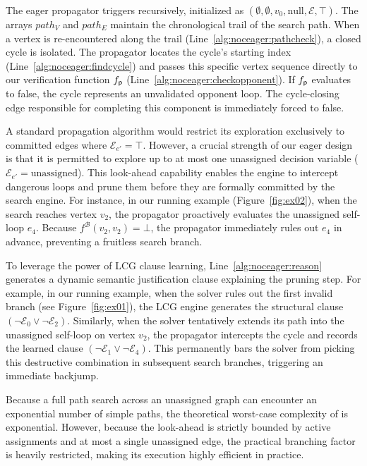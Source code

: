 \documentclass[a4paper,fleqn]{cas-sc}
\begin{document}
The eager propagator triggers recursively, initialized as \noceager$(\emptyset, \emptyset, v_0, \text{null}, \mathcal{E}, \top)$. The arrays $path_V$ and $path_E$ maintain the chronological trail of the search path. 
%
When a vertex is re-encountered along the trail (Line~\ref{alg:noceager:pathcheck}), a closed cycle is isolated. The propagator locates the cycle's starting index (Line~\ref{alg:noceager:findcycle}) and passes this specific vertex sequence directly to our verification function $f_{\mathsf{p}}$ (Line~\ref{alg:noceager:checkopponent}). If $f_{\mathsf{p}}$ evaluates to false, the cycle represents an unvalidated opponent loop. The cycle-closing edge responsible for completing this component is immediately forced to false.

A standard propagation algorithm would restrict its exploration exclusively to committed edges where $\mathcal{E}_{e'} = \top$. However, a crucial strength of our eager design is that it is permitted to explore up to at most one unassigned decision variable ($\mathcal{E}_{e'} = \text{unassigned}$). This look-ahead capability enables the engine to intercept dangerous loops and prune them before they are formally committed by the search engine. For instance, in our running example (Figure~\ref{fig:ex02}), when the search reaches vertex $v_2$, the propagator proactively evaluates the unassigned self-loop $e_4$. Because $f^{\mathcal{B}}(v_2, v_2) = \bot$, the propagator immediately rules out $e_4$ in advance, preventing a fruitless search branch.

To leverage the power of LCG clause learning, Line~\ref{alg:noceager:reason} generates a dynamic semantic justification clause explaining the pruning step. For example, in our running example, when the solver rules out the first invalid branch (see Figure~\ref{fig:ex01}), the LCG engine generates the structural clause $(\neg \mathcal{E}_0 \lor \neg \mathcal{E}_2)$. Similarly, when the solver tentatively extends its path into the unassigned self-loop on vertex $v_2$, the propagator intercepts the cycle and records the learned clause $(\neg \mathcal{E}_1 \lor \neg \mathcal{E}_4)$. This permanently bars the solver from picking this destructive combination in subsequent search branches, triggering an immediate backjump.

Because a full path search across an unassigned graph can encounter an exponential number of simple paths, the theoretical worst-case complexity of \noceager is exponential. However, because the look-ahead is strictly bounded by active assignments and at most a single unassigned edge, the practical branching factor is heavily restricted, making its execution highly efficient in practice.
\end{document}
